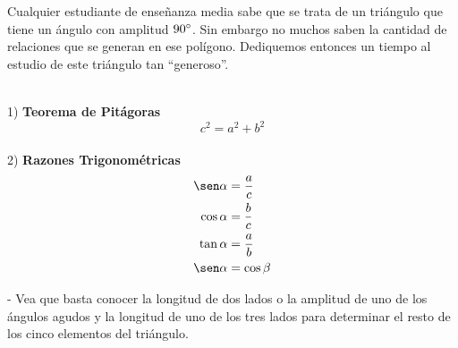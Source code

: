 Cualquier estudiante de enseñanza media sabe que se trata de un triángulo que tiene un ángulo con amplitud $90\degree$. Sin embargo no muchos saben la cantidad de relaciones que se generan en ese polígono. Dediquemos entonces un tiempo al estudio de este triángulo tan ``generoso''.

\begin{multicols}{2}
\columnbreak\\
1) \textbf{Teorema de Pitágoras}\\
\[c^2 = a^2 + b^2\]\\
2) \textbf{Razones Trigonométricas}
\begin{align*}
\sen\alpha &= \dfrac{a}{c}\\
\cos\alpha &= \dfrac{b}{c}\\
\tan\alpha &= \dfrac{a}{b}\\
\sen\alpha &= \cos\beta
\end{align*}
\end{multicols}

- Vea que basta conocer la longitud de dos lados o la amplitud de uno de los ángulos agudos y la longitud de uno de los tres lados para determinar el resto de los cinco elementos del triángulo.


